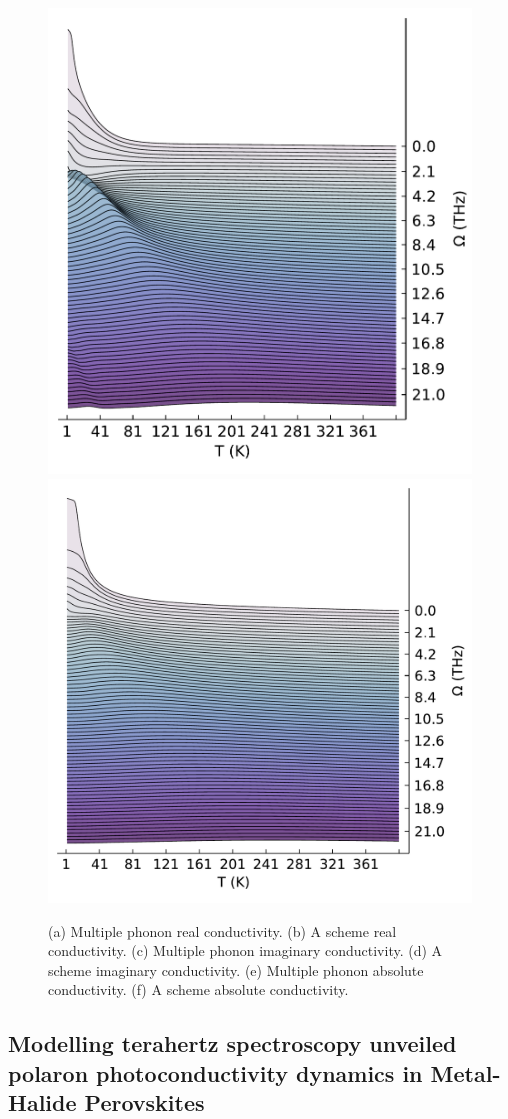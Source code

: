 \begin{figure}
    \includegraphics[width=.49\textwidth]{figures/multi_plot_freq_abs.pdf}
    \includegraphics[width=.49\textwidth]{figures/A_plot_freq_abs.pdf}
    \caption{(a) Multiple phonon real conductivity. (b) A scheme real conductivity. (c) Multiple phonon imaginary conductivity. (d) A scheme imaginary conductivity. (e) Multiple phonon absolute conductivity. (f) A scheme absolute conductivity.}
\end{figure}

\subsection{Modelling terahertz spectroscopy unveiled polaron photoconductivity dynamics in Metal-Halide Perovskites}

